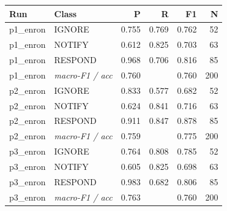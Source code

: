 \begin{tabular}{llrrrr}
\toprule
Run & Class & P & R & F1 & N \\
\midrule
p1_enron & IGNORE & 0.755 & 0.769 & 0.762 & 52 \\
p1_enron & NOTIFY & 0.612 & 0.825 & 0.703 & 63 \\
p1_enron & RESPOND & 0.968 & 0.706 & 0.816 & 85 \\
p1_enron & \textit{macro-F1 / acc} & 0.760 &  & 0.760 & 200 \\
p2_enron & IGNORE & 0.833 & 0.577 & 0.682 & 52 \\
p2_enron & NOTIFY & 0.624 & 0.841 & 0.716 & 63 \\
p2_enron & RESPOND & 0.911 & 0.847 & 0.878 & 85 \\
p2_enron & \textit{macro-F1 / acc} & 0.759 &  & 0.775 & 200 \\
p3_enron & IGNORE & 0.764 & 0.808 & 0.785 & 52 \\
p3_enron & NOTIFY & 0.605 & 0.825 & 0.698 & 63 \\
p3_enron & RESPOND & 0.983 & 0.682 & 0.806 & 85 \\
p3_enron & \textit{macro-F1 / acc} & 0.763 &  & 0.760 & 200 \\
\bottomrule
\end{tabular}
